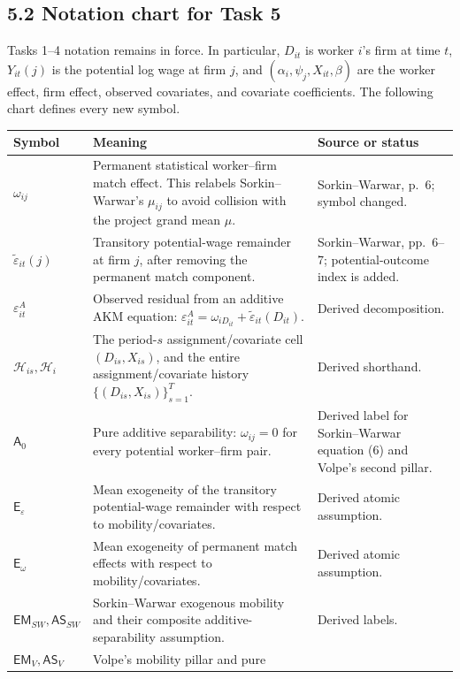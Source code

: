 \documentclass[11pt]{article}
\begin{document}
\subsection{5.2 Notation chart for Task 5}

Tasks 1--4 notation remains in force.  In particular, \(D_{it}\) is worker
\(i\)'s firm at time \(t\), \(Y_{it}(j)\) is the potential log wage at firm
\(j\), and \((\alpha_i,\psi_j,X_{it},\beta)\) are the worker effect, firm
effect, observed covariates, and covariate coefficients.  The following chart
defines every new symbol.

\begin{longtable}{p{}p{}p{}}
\textbf{Symbol} & \textbf{Meaning} & \textbf{Source or status} \\
\hline
\(\omega_{ij}\) & Permanent statistical worker--firm match effect.  This
relabels Sorkin--Warwar's \(\mu_{ij}\) to avoid collision with the project
grand mean \(\mu\). & Sorkin--Warwar, p.\ 6; symbol changed. \\
\(\widetilde\varepsilon_{it}(j)\) & Transitory potential-wage remainder at
firm \(j\), after removing the permanent match component. & Sorkin--Warwar,
pp.\ 6--7; potential-outcome index is added. \\
\(\varepsilon^A_{it}\) & Observed residual from an additive AKM equation:
\(\varepsilon^A_{it}=\omega_{iD_{it}}+
\widetilde\varepsilon_{it}(D_{it})\). & Derived decomposition. \\
\(\mathcal H_{is},\mathcal H_i\) & The period-\(s\) assignment/covariate cell
\((D_{is},X_{is})\), and the entire assignment/covariate history
\(\{(D_{is},X_{is})\}_{s=1}^T\). & Derived shorthand. \\
\(\mathsf A_0\) & Pure additive separability:
\(\omega_{ij}=0\) for every potential worker--firm pair. & Derived label for
Sorkin--Warwar equation (6) and Volpe's second pillar. \\
\(\mathsf E_\varepsilon\) & Mean exogeneity of the transitory potential-wage
remainder with respect to mobility/covariates. & Derived atomic assumption. \\
\(\mathsf E_\omega\) & Mean exogeneity of permanent match effects with
respect to mobility/covariates. & Derived atomic assumption. \\
\(\mathsf{EM}_{SW},\mathsf{AS}_{SW}\) & Sorkin--Warwar exogenous mobility and
their composite additive-separability assumption. & Derived labels. \\
\(\mathsf{EM}_{V},\mathsf{AS}_{V}\) & Volpe's mobility pillar and pure

\end{longtable}
\end{document}
